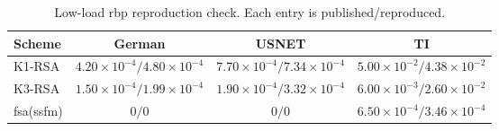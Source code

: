 \begin{table}[t]
\centering
\caption{Low-load \acs{rbp} reproduction check. Each entry is
published/reproduced.}
\label{tab:baseline_low_load_validation}
\scriptsize
\setlength{\tabcolsep}{3.2pt}
\begin{tabular}{lccc}
\toprule
\textbf{Scheme} & \textbf{German} & \textbf{USNET} & \textbf{TI} \\
\midrule
K1-RSA
& \(4.20{\times}10^{-4}/4.80{\times}10^{-4}\)
& \(7.70{\times}10^{-4}/7.34{\times}10^{-4}\)
& \(5.00{\times}10^{-2}/4.38{\times}10^{-2}\) \\
K3-RSA
& \(1.50{\times}10^{-4}/1.99{\times}10^{-4}\)
& \(1.90{\times}10^{-4}/3.32{\times}10^{-4}\)
& \(6.00{\times}10^{-3}/2.60{\times}10^{-2}\) \\
\acs{fsa}(\acs{ssfm})
& \(0/0\)
& \(0/0\)
& \(6.50{\times}10^{-4}/3.46{\times}10^{-4}\) \\
\bottomrule
\end{tabular}
\end{table}

